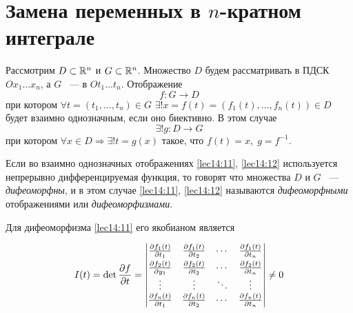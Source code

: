 \documentclass[../../main.tex]{subfiles}
\begin{document}
	\section{Замена переменных в $n$-кратном интеграле}
	
	Рассмотрим $D \subset \mathbb{R}^n$ и $G \subset \mathbb{R}^n$. Множество $D$ будем 
	рассматривать в ПДСК\\ $Ox_1 \ldots x_n$, а $G$ ~--- в $Ot_1 \ldots t_n$.
	Отображение 
	\begin{equation}
	\label{lec14:11}
	f : G \to D
	\end{equation} при котором 
	$\forall t = \left( t_1, \ldots, t_n \right) \in G$ $\exists ! 
	x = f\left(t\right) = \left(f_1\left( t\right) , \ldots, f_n\left( t\right)  \right)  \in D$
	будет взаимно однозначным, если оно биективно. В этом случае 
	\begin{equation}
	\label{lec14:12}
	\exists ! g :  D \to G
	\end{equation}
	при котором $\forall x \in D \Rightarrow  \exists ! t = g\left( x\right) $ такое, что 
	$f\left( t\right)  = x,\; g = f^{-1}$.
	
	Если во взаимно однозначных отображениях \eqref{lec14:11}, \eqref{lec14:12}
	используется непрерывно дифференцируемая функция, то говорят что множества $D$ и $G$ ~--- \emph{дифеоморфны}, и в этом случае 
	\eqref{lec14:11}, \eqref{lec14:12} называются \emph{дифеоморфными} отображениями
	или \emph{дифеоморфизмами}.
	
	Для дифеоморфизма \eqref{lec14:11} его якобианом является 
	
	\begin{equation}
	\label{lec14:13}
	I(t) = \det \frac{\partial f}{\partial t}=
	\begin{vmatrix}
	\smallskip
	\frac{\partial f_1\left(t\right)}{\partial t_1} & \frac{\partial f_1\left(t\right)}{\partial t_2}
	& \cdots & \frac{\partial f_1\left(t\right)}{\partial t_n} \\
	\frac{\partial f_2\left(t\right)}{\partial y_1} & \frac{\partial f_2\left(t\right)}{\partial t_2} 
	& \cdots & \frac{\partial f_2\left(t\right)}{\partial t_n} \\
	\vdots  & \vdots  & \ddots & \vdots  \\
	\frac{\partial f_n\left(t\right)}{\partial t_1} & \frac{\partial f_n\left(t\right)}{\partial t_2}
	& \cdots & \frac{\partial f_n\left(t\right)}{\partial t_n}
	\end{vmatrix} \ne 0
	\end{equation}
	
\end{document}
